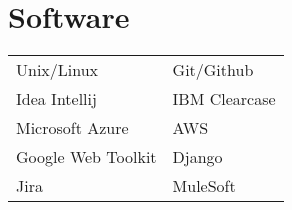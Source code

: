 \documentclass[]{deedy_format_Hien}
\begin{document}
\begin{minipage}[t]{0.325\textwidth}

\section{Software} 
\vspace{2mm} %
\begin{tabular}{ll}
Unix/Linux & Git/Github \\
Idea Intellij & IBM Clearcase \\
Microsoft Azure & AWS \\
Google Web Toolkit & Django \\ 
Jira & MuleSoft

\end{tabular}
\sectionsep



\end{minipage} 
\hfill
\end{document}
